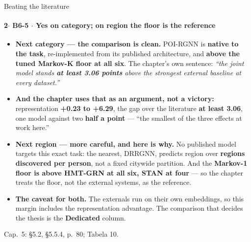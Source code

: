 \documentclass{beamer}
\begin{document}
\begin{frame}[noframenumbering]{Beating the literature}
    \framesubtitle{\normalsize 2$\cdot$ \textbf{B6-5} $\cdot$ Yes on category; on region the floor is the reference}
    \hypertarget{b65}{}
    \footnotesize\begin{itemize}\setlength{\itemsep}{3pt}\setlength{\parskip}{0pt}
        \item \textbf{\color{primaryshade}Next category --- the comparison is clean.} POI-RGNN is
              \textbf{native to the task}, re-implemented from its published architecture, and
              \textbf{above the tuned Markov-K floor at all six}. The chapter's own sentence:
              \textit{``the joint model stands \textbf{at least 3.06 points} above the strongest
              external baseline at every dataset.''}
        \item \textbf{And the chapter uses that as an argument, not a victory:} representation
              \textbf{+0.23 to +6.29}, the gap over the literature \textbf{at least 3.06}, one model
              against two \textbf{half a point} --- \alert{``the smallest of the three effects at
              work here.''}
        \item \textbf{\color{alertshade}Next region --- more careful, and here is why.} No published
              model targets this exact task: the nearest, DRRGNN, predicts region over
              \textbf{regions discovered per person}, not a fixed citywide partition. And the
              \textbf{Markov-1 floor is above HMT-GRN at all six, STAN at four} --- so the chapter
              treats \alert{the floor, not the external systems}, as the reference.
        \item \textbf{The caveat for both.} The externals run on their own embeddings, so this
              margin \alert{includes the representation advantage}. The comparison that decides the
              thesis is the \textbf{Dedicated} column.
    \end{itemize}
    \vfill
    {\scriptsize
    \begin{minipage}[b]{0.775\linewidth}\raggedright\textcolor{black!70}{Cap.~5: §5.2, §5.5.4, p.~80; Tabela 10.}\end{minipage}\hfill
    \begin{minipage}[b]{0.20\linewidth}\raggedleft \hyperlink{b0}{}\end{minipage}}
\end{frame}
\end{document}
